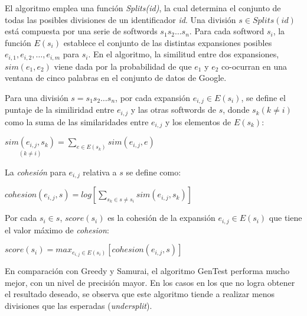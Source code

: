 El algoritmo emplea una función \textit{Splits(id)}, la cual determina el conjunto de todas las posibles divisiones de un identificador \textit{id}.
Una división $s \in Splits(id)$ está compuesta por una serie de softwords $s_1 s_2 \dots s_n$.
Para cada softword $s_i$, la función $E(s_i)$ establece el conjunto de las distintas expansiones posibles $e_{i,1}, e_{i,2}, \dots, e_{i,m}$ para $s_i$.
En el algoritmo, la similitud entre dos expansiones, $sim(e_1, e_2)$ viene dada por la probabilidad de que $e_1$ y $e_2$ co-ocurran en una ventana de cinco palabras en el conjunto de datos de Google.

Para una división $s = s_1 s_2 \dots s_n$, por cada expansión $e_{i,j} \in E(s_i)$, se define el puntaje de la similiridad entre $e_{i,j}$ y las otras softwords de $s$, donde $s_k (k \neq i)$ como la suma de las similaridades entre $e_{i,j}$ y los elementos de $E(s_k)$:

\begin{center}
  $\underset{(k \neq i)}{sim(e_{i,j}, s_k)} = \displaystyle\sum_{e \in E(s_k)} sim(e_{i,j}, e)$
\end{center}

La \textit{cohesión} para $e_{i,j}$ relativa a $s$ se define como:

\begin{center}
  $cohesion(e_{i,j}, s) = log \displaystyle [\sum_{s_k \in s \neq s_i} sim(e_{i,j}, s_k)]$
\end{center}

Por cada $s_i \in s$, $score(s_i)$ es la cohesión de la expansión $e_{i,j} \in E(s_i)$ que tiene el valor máximo de \textit{cohesion}:

\begin{center}
  $score(s_i) = max_{e_{i,j} \in E(s_i)} [cohesion(e_{i,j}, s)]$
\end{center}

En comparación con Greedy y Samurai, el algoritmo GenTest performa mucho mejor, con un nivel de precisión mayor.
En los casos en los que no logra obtener el resultado deseado, se observa que este algoritmo tiende a realizar menos divisiones que las esperadas (\textit{undersplit}).
